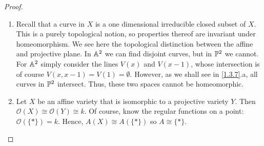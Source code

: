 \begin{proof}
\begin{enumerate}[label = (\alph*)]
        Of course, we still need to show that these conics are isomorphic to $\P^1$ itself. We'll defer part of this proof until \ref{1.3.4}, which shows that the $d$-uple embedding is an isomorphism onto its image. By \ref{1.2.12} of the last section, we know the ideal of the image is the kernel of the map $k[y_0, y_1, y_2] \longrightarrow k[x_0, x_1]$ sending $y_0 \mapsto x_0^2$, $y_1 \mapsto x_0 x_1$, and $y_2 \mapsto x_1^2$. Letting $\a$ be the kernel, we want to show that the inclusion $(xy - z^2) \subseteq \a$ is an equality. This should proceed as in \ref{1.2.15}, i.e. we'll show they have the same codimension. Equivalently, that $\codim \a = 1$. Hence, we just want to show that the image $k[x_0^2, x_0 x_1, x_1^2]$ is two dimensional. Indeed, it's obvious enough that $x_0^2$ and $x_1^2$ are algebraically independent. Furthermore, $x_0 x_1$ satisfies $t^2 - x_0^2 x_1^2$ and is hence integral over the other two. Thus, the dimension is indeed two, so $\codim \a = 3 - 2 = 1$ and we have equality. Thus, the image of the $2$-uple embedding $\P^1 \longrightarrow \P^2$ is an isomorphism onto $Z(xy - z^2)$. Thus, all conics are indeed isomorphic to $\P^1$.

        Sidenote: it'd be interesting to prove that all plane conics are isomorphic using methos from projective geometry itself, rather than this incidental change of coordinates. Perhaps we can consider the Veronese surface, i.e. the image of $\P^2 \longrightarrow \P^5$ under the $2$-uple embedding. A conic takes the form $a x^2 + b xy + c xz + d y^2 + e yz + f y^2$, which corresponds exactly to the point $[a : b : c : d : e : f] \in \P^5$. This idea of ``straightening out" the variety to get a linear variety via the $d$-uple embedding is explored more in \ref{1.3.5}.

        \item Recall that a curve in $X$ is a one dimensional irreducible closed subset of $X$. This is a purely topological notion, so properties thereof are invariant under homeomorphism. We see here the topological distinction between the affine and projective plane. In $\A^2$ we can find disjoint curves, but in $\P^2$ we cannot. For $\A^2$ simply consider the lines $V(x)$ and $V(x - 1)$, whose intersection is of course $V(x, x - 1) = V(1) = \emptyset$. However, as we shall see in \ref{1.3.7}.a, all curves in $\P^2$ intersect. Thus, these two spaces cannot be homeomorphic.

        \item Let $X$ be an affine variety that is isomorphic to a projective variety $Y$. Then $\mathcal O(X) \cong \mathcal O(Y) \cong k$. Of course, know the regular functions on a point: $\mathcal O(\{*\}) = k$. Hence, $A(X) \cong A(\{*\})$ so $A \cong \{*\}$.
    \end{enumerate}
\end{proof}
